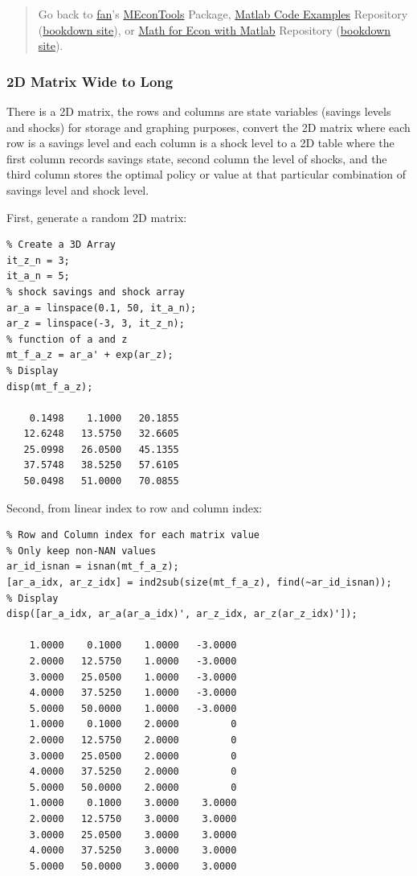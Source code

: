 \documentclass[
]{book}
\begin{document}
\begin{quote}
Go back to \href{http://fanwangecon.github.io/}{fan}'s \href{https://fanwangecon.github.io/MEconTools/}{MEconTools} Package, \href{https://fanwangecon.github.io/M4Econ/}{Matlab Code Examples} Repository (\href{https://fanwangecon.github.io/M4Econ/bookdown}{bookdown site}), or \href{https://fanwangecon.github.io/Math4Econ/}{Math for Econ with Matlab} Repository (\href{https://fanwangecon.github.io/Math4Econ/bookdown}{bookdown site}).
\end{quote}

\hypertarget{d-matrix-wide-to-long}{%
\subsubsection{2D Matrix Wide to Long}\label{d-matrix-wide-to-long}}

There is a 2D matrix, the rows and columns are state variables (savings
levels and shocks) for storage and graphing purposes, convert the 2D
matrix where each row is a savings level and each column is a shock
level to a 2D table where the first column records savings state, second
column the level of shocks, and the third column stores the optimal
policy or value at that particular combination of savings level and
shock level.

First, generate a random 2D matrix:

\begin{verbatim}
% Create a 3D Array
it_z_n = 3;
it_a_n = 5;
% shock savings and shock array
ar_a = linspace(0.1, 50, it_a_n);
ar_z = linspace(-3, 3, it_z_n);
% function of a and z
mt_f_a_z = ar_a' + exp(ar_z);
% Display
disp(mt_f_a_z);

    0.1498    1.1000   20.1855
   12.6248   13.5750   32.6605
   25.0998   26.0500   45.1355
   37.5748   38.5250   57.6105
   50.0498   51.0000   70.0855
\end{verbatim}

Second, from linear index to row and column index:

\begin{verbatim}
% Row and Column index for each matrix value
% Only keep non-NAN values
ar_id_isnan = isnan(mt_f_a_z);
[ar_a_idx, ar_z_idx] = ind2sub(size(mt_f_a_z), find(~ar_id_isnan));
% Display
disp([ar_a_idx, ar_a(ar_a_idx)', ar_z_idx, ar_z(ar_z_idx)']);

    1.0000    0.1000    1.0000   -3.0000
    2.0000   12.5750    1.0000   -3.0000
    3.0000   25.0500    1.0000   -3.0000
    4.0000   37.5250    1.0000   -3.0000
    5.0000   50.0000    1.0000   -3.0000
    1.0000    0.1000    2.0000         0
    2.0000   12.5750    2.0000         0
    3.0000   25.0500    2.0000         0
    4.0000   37.5250    2.0000         0
    5.0000   50.0000    2.0000         0
    1.0000    0.1000    3.0000    3.0000
    2.0000   12.5750    3.0000    3.0000
    3.0000   25.0500    3.0000    3.0000
    4.0000   37.5250    3.0000    3.0000
    5.0000   50.0000    3.0000    3.0000
\end{verbatim}
\end{document}
